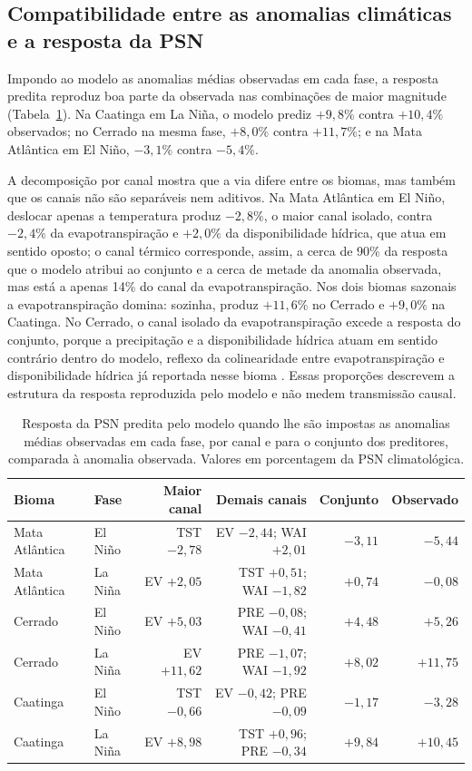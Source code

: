 \documentclass[a4paper,fleqn]{cas-sc}
\begin{document}
\subsection{Compatibilidade entre as anomalias climáticas e a resposta da PSN}

Impondo ao modelo as anomalias médias observadas em cada fase, a resposta predita reproduz boa parte da observada nas combinações de maior magnitude (Tabela~\ref{tab:perturbacao}). Na Caatinga em La Niña, o modelo prediz $+9{,}8\%$ contra $+10{,}4\%$ observados; no Cerrado na mesma fase, $+8{,}0\%$ contra $+11{,}7\%$; e na Mata Atlântica em El Niño, $-3{,}1\%$ contra $-5{,}4\%$.

A decomposição por canal mostra que a via difere entre os biomas, mas também que os canais não são separáveis nem aditivos. Na Mata Atlântica em El Niño, deslocar apenas a temperatura produz $-2{,}8\%$, o maior canal isolado, contra $-2{,}4\%$ da evapotranspiração e $+2{,}0\%$ da disponibilidade hídrica, que atua em sentido oposto; o canal térmico corresponde, assim, a cerca de 90\% da resposta que o modelo atribui ao conjunto e a cerca de metade da anomalia observada, mas está a apenas 14\% do canal da evapotranspiração. Nos dois biomas sazonais a evapotranspiração domina: sozinha, produz $+11{,}6\%$ no Cerrado e $+9{,}0\%$ na Caatinga. No Cerrado, o canal isolado da evapotranspiração excede a resposta do conjunto, porque a precipitação e a disponibilidade hídrica atuam em sentido contrário dentro do modelo, reflexo da colinearidade entre evapotranspiração e disponibilidade hídrica já reportada nesse bioma \citep{oliveira2026}. Essas proporções descrevem a estrutura da resposta reproduzida pelo modelo e não medem transmissão causal.

\begin{table}[width=\linewidth,cols=6,pos=!ht]
\caption{Resposta da PSN predita pelo modelo quando lhe são impostas as anomalias médias observadas em cada fase, por canal e para o conjunto dos preditores, comparada à anomalia observada. Valores em porcentagem da PSN climatológica.}
\label{tab:perturbacao}
\begin{tabular*}{\tblwidth}{@{}llrrrr@{}}
\toprule
Bioma & Fase & Maior canal & Demais canais & Conjunto & Observado \\
\midrule
Mata Atlântica & El Niño & TST $-2{,}78$ & EV $-2{,}44$; WAI $+2{,}01$ & $-3{,}11$ & $-5{,}44$ \\
Mata Atlântica & La Niña & EV $+2{,}05$  & TST $+0{,}51$; WAI $-1{,}82$ & $+0{,}74$ & $-0{,}08$ \\
Cerrado        & El Niño & EV $+5{,}03$  & PRE $-0{,}08$; WAI $-0{,}41$ & $+4{,}48$ & $+5{,}26$ \\
Cerrado        & La Niña & EV $+11{,}62$ & PRE $-1{,}07$; WAI $-1{,}92$ & $+8{,}02$ & $+11{,}75$ \\
Caatinga       & El Niño & TST $-0{,}66$ & EV $-0{,}42$; PRE $-0{,}09$ & $-1{,}17$ & $-3{,}28$ \\
Caatinga       & La Niña & EV $+8{,}98$  & TST $+0{,}96$; PRE $-0{,}34$ & $+9{,}84$ & $+10{,}45$ \\
\bottomrule
\end{tabular*}
\end{table}
\end{document}
